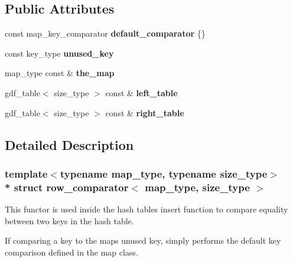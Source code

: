\subsection*{Public Attributes}
\begin{DoxyCompactItemize}
\item 
const map\+\_\+key\+\_\+comparator {\bfseries default\+\_\+comparator} \{\}\hypertarget{structrow__comparator_a7d1d67f8366a1c71d9d880bb9b840698}{}\label{structrow__comparator_a7d1d67f8366a1c71d9d880bb9b840698}

\item 
const key\+\_\+type {\bfseries unused\+\_\+key}\hypertarget{structrow__comparator_a94af7d38b59e365e9e3bcceb838fb733}{}\label{structrow__comparator_a94af7d38b59e365e9e3bcceb838fb733}

\item 
map\+\_\+type const \& {\bfseries the\+\_\+map}\hypertarget{structrow__comparator_a9bc2f555ccb5fe4ec1073f8b2e74de83}{}\label{structrow__comparator_a9bc2f555ccb5fe4ec1073f8b2e74de83}

\item 
gdf\+\_\+table$<$ size\+\_\+type $>$ const \& {\bfseries left\+\_\+table}\hypertarget{structrow__comparator_a80e31ed42416fcf0577517e90520b913}{}\label{structrow__comparator_a80e31ed42416fcf0577517e90520b913}

\item 
gdf\+\_\+table$<$ size\+\_\+type $>$ const \& {\bfseries right\+\_\+table}\hypertarget{structrow__comparator_a8e0f7be825b2b612739edf0ddb26b368}{}\label{structrow__comparator_a8e0f7be825b2b612739edf0ddb26b368}

\end{DoxyCompactItemize}


\subsection{Detailed Description}
\subsubsection*{template$<$typename map\+\_\+type, typename size\+\_\+type$>$\\*
struct row\+\_\+comparator$<$ map\+\_\+type, size\+\_\+type $>$}

This functor is used inside the hash table\textquotesingle{}s insert function to compare equality between two keys in the hash table.

If comparing a key to the map\textquotesingle{}s unused key, simply performs the default key comparison defined in the map class.

